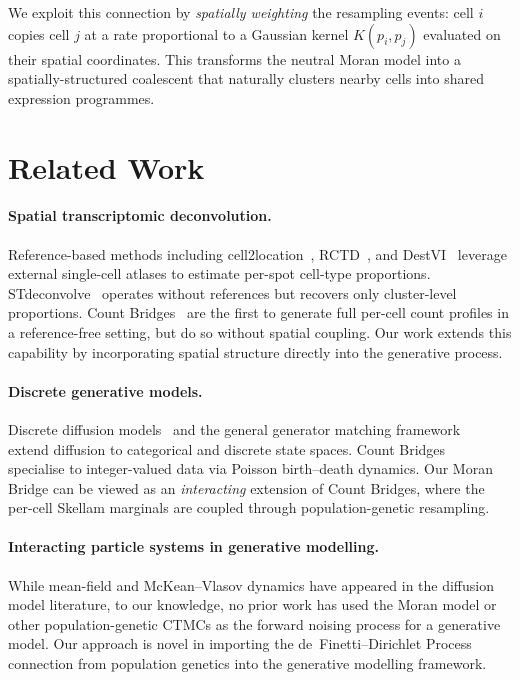 \documentclass[11pt]{article}
\begin{document}
We exploit this connection by \emph{spatially weighting} the resampling events: cell $i$ copies cell $j$ at a rate proportional to a Gaussian kernel $K(p_i, p_j)$ evaluated on their spatial coordinates. This transforms the neutral Moran model into a spatially-structured coalescent that naturally clusters nearby cells into shared expression programmes.

\section{Related Work}
\label{sec:related}

\paragraph{Spatial transcriptomic deconvolution.}
Reference-based methods including cell2location~\citep{kleshchevnikov2022cell2location}, RCTD~\citep{cable2022rctd}, and DestVI~\citep{lopez2022destvi} leverage external single-cell atlases to estimate per-spot cell-type proportions. STdeconvolve~\citep{miller2022stdeconvolve} operates without references but recovers only cluster-level proportions. Count Bridges~\citep{fishman2025count} are the first to generate full per-cell count profiles in a reference-free setting, but do so without spatial coupling. Our work extends this capability by incorporating spatial structure directly into the generative process.

\paragraph{Discrete generative models.}
Discrete diffusion models~\citep{austin2021structured, campbell2022continuous} and the general generator matching framework~\citep{holderrieth2024generator} extend diffusion to categorical and discrete state spaces. Count Bridges~\citep{fishman2025count} specialise to integer-valued data via Poisson birth--death dynamics. Our Moran Bridge can be viewed as an \emph{interacting} extension of Count Bridges, where the per-cell Skellam marginals are coupled through population-genetic resampling.

\paragraph{Interacting particle systems in generative modelling.}
While mean-field and McKean--Vlasov dynamics have appeared in the diffusion model literature, to our knowledge, no prior work has used the Moran model or other population-genetic CTMCs as the forward noising process for a generative model. Our approach is novel in importing the de~Finetti--Dirichlet Process connection from population genetics into the generative modelling framework.
\end{document}
